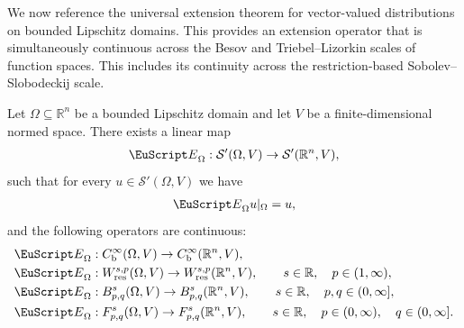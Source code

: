 \documentclass[10pt,a4paper]{amsart}
\theoremstyle{definition}
\theoremstyle{remark}
\numberwithin{equation}{section}
\newcommand{\bbR}{{\mathbb R}}
\newcommand{\calS}{{\mathcal S}}
\newcommand{\euE}{{\EuScript E}}
\renewcommand{\restriction}{|}
\newcommand{\Domain}{{\Omega}}
\newcommand{\Extension}{\euE}
\newcommand{\Wres}{W_{\mathrm{res}}}
\newcommand{\VEC}{{V}}
\newcommand{\bounded}{\mathrm{b}}
\begin{document}
We now reference the universal extension theorem for vector-valued distributions on bounded Lipschitz domains.
This provides an extension operator that is simultaneously continuous across the Besov and Triebel--Lizorkin scales of function spaces. This includes its continuity across the restriction-based Sobolev--Slobodeckij scale.


\begin{theorem}\label{theorem:extension-componentwise}
    Let $\Domain \subseteq \bbR^{n}$ be a bounded Lipschitz domain and let $\VEC$ be a finite-dimensional normed space.
    There exists a linear map 
    \begin{align*}
        \Extension_{\Domain} : \calS'(\Domain,\VEC) \to \calS'(\bbR^{n},\VEC),
    \end{align*}
    such that for every $u \in \calS'(\Domain,\VEC)$ we have 
    \begin{gather}\label{theorem:extension-componentwise:extension-property}
        \Extension_{\Domain} u \restriction_{\Domain} = u
        ,
    \end{gather}
    and the following operators are continuous:
    \begin{subequations}
    \begin{align}
        &
        \Extension_{\Domain} : C^{\infty}_{\bounded}(\Domain,\VEC) \to C^{\infty}_{\bounded}(\bbR^{n},\VEC), \label{math:extension-componentwise:smooth}
        \\
        &
        \Extension_{\Domain} : \Wres^{s,p}(\Domain,\VEC) \to \Wres^{s,p}(\bbR^{n},\VEC), \qquad s \in \bbR, \quad p \in (1,\infty), \label{math:extension-componentwise:sobolev}
        \\
        &
        \Extension_{\Domain} : B^{s}_{p,q}(\Domain,\VEC) \to B^{s}_{p,q}(\bbR^{n},\VEC), \qquad s \in \bbR, \quad p,q \in (0,\infty], \label{math:extension-componentwise:besov}
        \\
        &
        \Extension_{\Domain} : F^{s}_{p,q}(\Domain,\VEC) \to F^{s}_{p,q}(\bbR^{n},\VEC), \qquad s \in \bbR, \quad p \in (0,\infty), \quad q \in (0,\infty]. \label{math:extension-componentwise:triebellizorkin}
    \end{align}
    \end{subequations}
\end{theorem}
\end{document}
